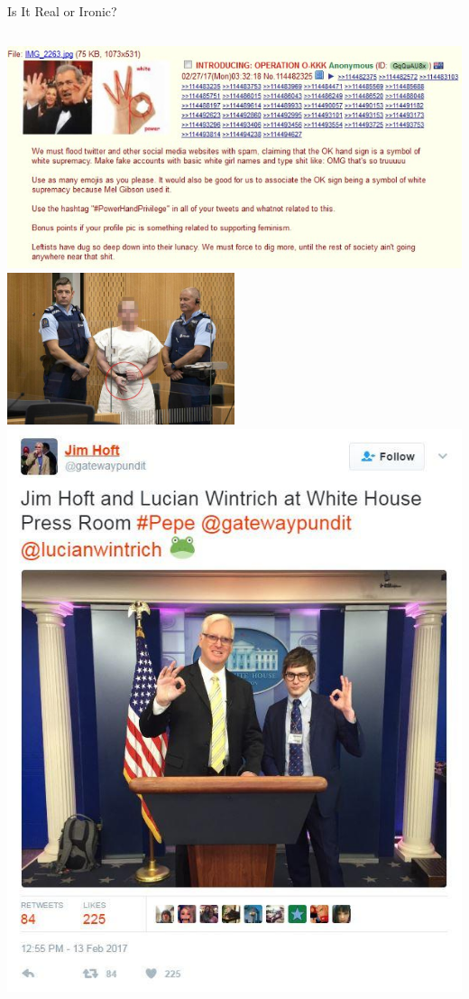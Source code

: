 \documentclass[nobackground,dvipsnames,table]{beamer}
\begin{document}
\begin{frame}{Is It Real or Ironic?}
    \begin{columns}
            \centering
            \includegraphics[width=\textwidth]{ok-symbol-4chan}
            \includegraphics[width=0.5\textwidth]{ok-symbol-brenton-tarrant}
            \includegraphics[width=\textwidth]{ok-symbol-hoft-wintrich}
    \end{columns}
\end{frame}
\end{document}
